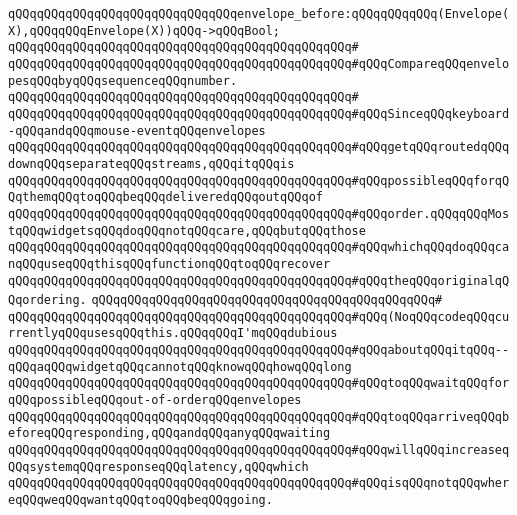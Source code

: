 \verb|qQQqqQQqqQQqqQQqqQQqqQQqqQQqqQQqenvelope_before:qQQqqQQqqQQq(Envelope(X),qQQqqQQqEnvelope(X))qQQq->qQQqBool;|\newline
\verb|qQQqqQQqqQQqqQQqqQQqqQQqqQQqqQQqqQQqqQQqqQQqqQQq#|\newline
\verb|qQQqqQQqqQQqqQQqqQQqqQQqqQQqqQQqqQQqqQQqqQQqqQQq#qQQqCompareqQQqenvelopesqQQqbyqQQqsequenceqQQqnumber.|\newline
\verb|qQQqqQQqqQQqqQQqqQQqqQQqqQQqqQQqqQQqqQQqqQQqqQQq#|\newline
\verb|qQQqqQQqqQQqqQQqqQQqqQQqqQQqqQQqqQQqqQQqqQQqqQQq#qQQqSinceqQQqkeyboard-qQQqandqQQqmouse-eventqQQqenvelopes|\newline
\verb|qQQqqQQqqQQqqQQqqQQqqQQqqQQqqQQqqQQqqQQqqQQqqQQq#qQQqgetqQQqroutedqQQqdownqQQqseparateqQQqstreams,qQQqitqQQqis|\newline
\verb|qQQqqQQqqQQqqQQqqQQqqQQqqQQqqQQqqQQqqQQqqQQqqQQq#qQQqpossibleqQQqforqQQqthemqQQqtoqQQqbeqQQqdeliveredqQQqoutqQQqof|\newline
\verb|qQQqqQQqqQQqqQQqqQQqqQQqqQQqqQQqqQQqqQQqqQQqqQQq#qQQqorder.qQQqqQQqMostqQQqwidgetsqQQqdoqQQqnotqQQqcare,qQQqbutqQQqthose|\newline
\verb|qQQqqQQqqQQqqQQqqQQqqQQqqQQqqQQqqQQqqQQqqQQqqQQq#qQQqwhichqQQqdoqQQqcanqQQquseqQQqthisqQQqfunctionqQQqtoqQQqrecover|\newline
\verb|qQQqqQQqqQQqqQQqqQQqqQQqqQQqqQQqqQQqqQQqqQQqqQQq#qQQqtheqQQqoriginalqQQqordering.|\newline
\verb|qQQqqQQqqQQqqQQqqQQqqQQqqQQqqQQqqQQqqQQqqQQqqQQq#|\newline
\verb|qQQqqQQqqQQqqQQqqQQqqQQqqQQqqQQqqQQqqQQqqQQqqQQq#qQQq(NoqQQqcodeqQQqcurrentlyqQQqusesqQQqthis.qQQqqQQqI'mqQQqdubious|\newline
\verb|qQQqqQQqqQQqqQQqqQQqqQQqqQQqqQQqqQQqqQQqqQQqqQQq#qQQqaboutqQQqitqQQq--qQQqaqQQqwidgetqQQqcannotqQQqknowqQQqhowqQQqlong|\newline
\verb|qQQqqQQqqQQqqQQqqQQqqQQqqQQqqQQqqQQqqQQqqQQqqQQq#qQQqtoqQQqwaitqQQqforqQQqpossibleqQQqout-of-orderqQQqenvelopes|\newline
\verb|qQQqqQQqqQQqqQQqqQQqqQQqqQQqqQQqqQQqqQQqqQQqqQQq#qQQqtoqQQqarriveqQQqbeforeqQQqresponding,qQQqandqQQqanyqQQqwaiting|\newline
\verb|qQQqqQQqqQQqqQQqqQQqqQQqqQQqqQQqqQQqqQQqqQQqqQQq#qQQqwillqQQqincreaseqQQqsystemqQQqresponseqQQqlatency,qQQqwhich|\newline
\verb|qQQqqQQqqQQqqQQqqQQqqQQqqQQqqQQqqQQqqQQqqQQqqQQq#qQQqisqQQqnotqQQqwhereqQQqweqQQqwantqQQqtoqQQqbeqQQqgoing.|\newline
